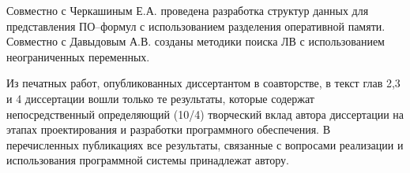 Совместно с Черкашиным Е.А. проведена разработка структур данных для представления ПО--формул с использованием разделения оперативной памяти. Совместно с Давыдовым А.В. созданы методики поиска ЛВ с использованием неограниченных переменных.

Из печатных работ, опубликованных диссертантом в соавторстве, в текст глав 2,3 и 4 диссертации вошли только те результаты, которые содержат непосредственный определяющий (10/4) творческий вклад автора диссертации на этапах проектирования и разработки программного обеспечения. В перечисленных публикациях все результаты, связанные с вопросами реализации и использования программной системы принадлежат автору.










